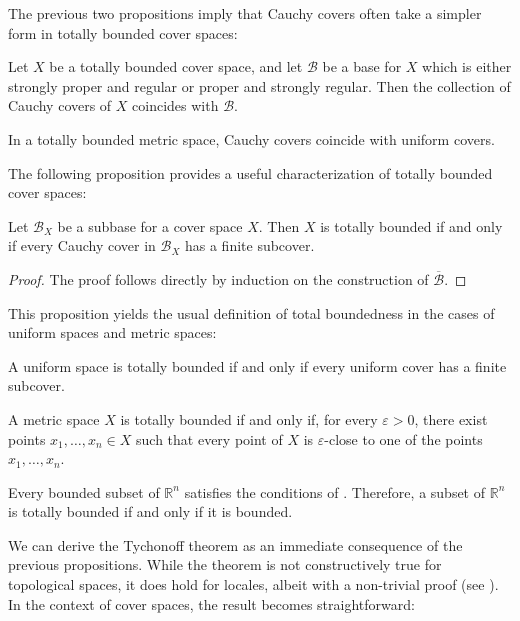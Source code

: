 \documentclass[reqno]{amsart}
\theoremstyle{definition}
\theoremstyle{remark}
\numberwithin{figure}{section}
\begin{document}
The previous two propositions imply that Cauchy covers often take a simpler form in totally bounded cover spaces:

\begin{cor}
Let $X$ be a totally bounded cover space, and let $\mathcal{B}$ be a base for $X$ which is either strongly proper and regular or proper and strongly regular.
Then the collection of Cauchy covers of $X$ coincides with $\mathcal{B}$.
\end{cor}

\begin{cor}
In a totally bounded metric space, Cauchy covers coincide with uniform covers.
\end{cor}

The following proposition provides a useful characterization of totally bounded cover spaces:

\begin{prop}[tb-aux]
Let $\mathcal{B}_X$ be a subbase for a cover space $X$.
Then $X$ is totally bounded if and only if every Cauchy cover in $\mathcal{B}_X$ has a finite subcover.
\end{prop}
\begin{proof}
The proof follows directly by induction on the construction of $\overline{\mathcal{B}}$.
\end{proof}

This proposition yields the usual definition of total boundedness in the cases of uniform spaces and metric spaces:

\begin{cor}
A uniform space is totally bounded if and only if every uniform cover has a finite subcover.
\end{cor}

\begin{cor}[tb-metric]
A metric space $X$ is totally bounded if and only if, for every $\varepsilon > 0$,
there exist points $x_1, \ldots, x_n \in X$ such that every point of $X$ is $\varepsilon$-close to one of the points $x_1, \ldots, x_n$.
\end{cor}

\begin{example}
Every bounded subset of $\mathbb{R}^n$ satisfies the conditions of .
Therefore, a subset of $\mathbb{R}^n$ is totally bounded if and only if it is bounded.
\end{example}

We can derive the Tychonoff theorem as an immediate consequence of the previous propositions.
While the theorem is not constructively true for topological spaces, it does hold for locales, albeit with a non-trivial proof (see \cite{vickers-tychonoff,vickers-compact}).
In the context of cover spaces, the result becomes straightforward:
\end{document}
